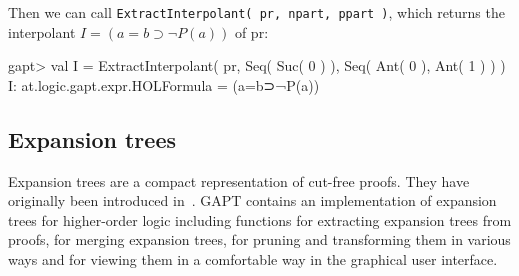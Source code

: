 \documentclass[a4paper,11pt]{article}
\newcommand{\impl}{\supset} %
\renewcommand{\lnot}{\neg}
\begin{document}
Then we can call \texttt{ExtractInterpolant( pr, npart, ppart )}, which returns the interpolant $I = (a=b \impl \lnot P(a))$ of pr:
\begin{clilisting}
gapt> val I = ExtractInterpolant( pr, Seq( Suc( 0 ) ), Seq( Ant( 0 ), Ant( 1 ) ) )
I: at.logic.gapt.expr.HOLFormula = (a=b⊃¬P(a))

\end{clilisting}

\subsection{Expansion trees}

Expansion trees are a compact representation of cut-free proofs. They have originally been
introduced in~\cite{Miller87Compact}. GAPT contains an implementation of
expansion trees for higher-order logic including functions for extracting expansion
trees from proofs, for merging expansion trees, for pruning and transforming them
in various ways and for viewing them in a comfortable way in the graphical user interface.
\end{document}
